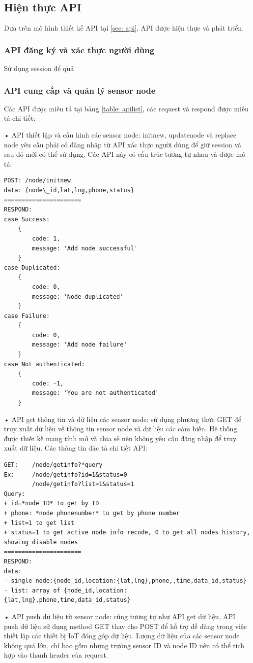 \subsection{Hiện thực API}
Dựa trên mô hình thiết kế API tại \ref{sec: api}, API được hiện thực và phát triển.


\subsubsection*{API đăng ký và xác thực người dùng}
Sử dụng session để quả
\subsubsection*{API cung cấp và quản lý sensor node}
Các API được miêu tả tại bảng \ref{table: apilist}, các request và respond được miêu tả chi tiết:

• API thiết lập và cấu hình các sensor node: initnew, updatenode và replace node yêu cầu phải có đăng nhập từ API xác thực người dùng để giữ session và sau đó mới có thể sử dụng. Các API này có cấu trúc tương tự nhau và được mô tả:
\begin{lstlisting}
POST: /node/initnew
data: {node\_id,lat,lng,phone,status}
======================
RESPOND:
case Success:
	{
		code: 1,
		message: 'Add node successful'
	}
case Duplicated:
	{
		code: 0,
		message: 'Node duplicated'
	}
case Failure:
	{
		code: 0,
		message: 'Add node failure'
	}
case Not authenticated:
	{
		code: -1,
		message: 'You are not authenticated'
	}
\end{lstlisting}

• API get thông tin và dữ liệu các sensor node: sử dụng phương thức GET để truy xuất dữ liệu về thông tin sensor node và dữ liệu các cảm biến. Hệ thống được thiết kế mang tính mở và chia sẻ nên không yêu cầu đăng nhập để truy xuất dữ liệu. Các thông tin đặc tả chi tiết API:
\begin{lstlisting}
GET:	/node/getinfo?*query
Ex: 	/node/getinfo?id=1&status=0
		/node/getinfo?list=1&status=1
Query:
+ id=*node ID* to get by ID
+ phone: *node phonenumber* to get by phone number
+ list=1 to get list
+ status=1 to get active node info recode, 0 to get all nodes history, showing disable nodes
======================
RESPOND:
data:
- single node:{node_id,location:{lat,lng},phone,,time,data_id,status}
- list: array of {node_id,location:{lat,lng},phone,time,data_id,status}
\end{lstlisting}

• API push dữ liệu từ sensor node: cũng tương tự như API get dữ liệu, API push dữ liệu sử dụng method GET thay cho POST để hỗ trợ dễ dàng trong việc thiết lập các thiết bị IoT đóng góp dữ liệu. Lượng dữ liệu của các sensor node không quá lớn, chỉ bao gồm những trường sensor ID và node ID nên có thể tích hợp vào thanh header của request.

